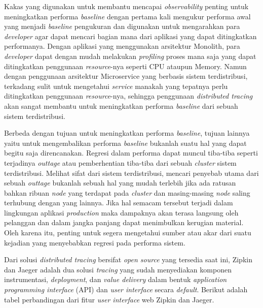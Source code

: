 Kakas yang digunakan untuk membantu mencapai \textit{observability} penting untuk meningkatkan performa \textit{baseline} dengan pertama kali mengukur performa awal yang menjadi \textit{baseline} pengukuran dan digunakan untuk mengarahkan para \textit{developer} agar dapat mencari bagian mana dari aplikasi yang dapat ditingkatkan performanya. Dengan aplikasi yang menggunakan arsitektur Monolith, para \textit{developer} dapat dengan mudah melakukan \textit{profiling} proses mana saja yang dapat ditingkatkan penggunaan \textit{resource}-nya seperti CPU ataupun Memory. Namun dengan penggunaan arsitektur Microservice yang berbasis sistem terdistribusi, terkadang sulit untuk mengetahui \textit{service} manakah yang tepatnya perlu ditingkatkan penggunaan \textit{resource}-nya, sehingga penggunaan \textit{distributed tracing} akan sangat membantu untuk meningkatkan performa \textit{baseline} dari sebuah sistem terdistribusi.

Berbeda dengan tujuan untuk meningkatkan performa \textit{baseline}, tujuan lainnya yaitu untuk mengembalikan performa \textit{baseline} bukanlah suatu hal yang dapat begitu saja direncanakan. Regresi dalam performa dapat muncul tiba-tiba seperti terjadinya \textit{outtage} atau pemberhentian tiba-tiba dari sebuah \textit{cluster} sistem terdistribusi. Melihat sifat dari sistem terdistribusi, mencari penyebab utama dari sebuah \textit{outtage} bukanlah sebuah hal yang mudah terlebih jika ada ratusan bahkan ribuan \textit{node} yang terdapat pada \textit{cluster} dan masing-masing \textit{node} saling terhubung dengan yang lainnya. Jika hal semacam tersebut terjadi dalam lingkungan aplikasi \textit{production} maka dampaknya akan terasa langsung oleh pelanggan dan dalam jangka panjang dapat menimbulkan kerugian material. Oleh karena itu, penting untuk segera mengetahui sumber atau akar dari suatu kejadian yang menyebabkan regresi pada performa sistem.

Dari solusi \textit{distributed tracing} bersifat \textit{open source} yang tersedia saat ini, Zipkin dan Jaeger adalah dua solusi \textit{tracing} yang sudah menyediakan komponen instrumentasi, \textit{deployment}, dan \textit{value delivery} dalam bentuk \textit{application programming interface} (API) dan \textit{user interface} secara \textit{default}. Berikut adalah tabel perbandingan dari fitur \textit{user interface} web Zipkin dan Jaeger.


